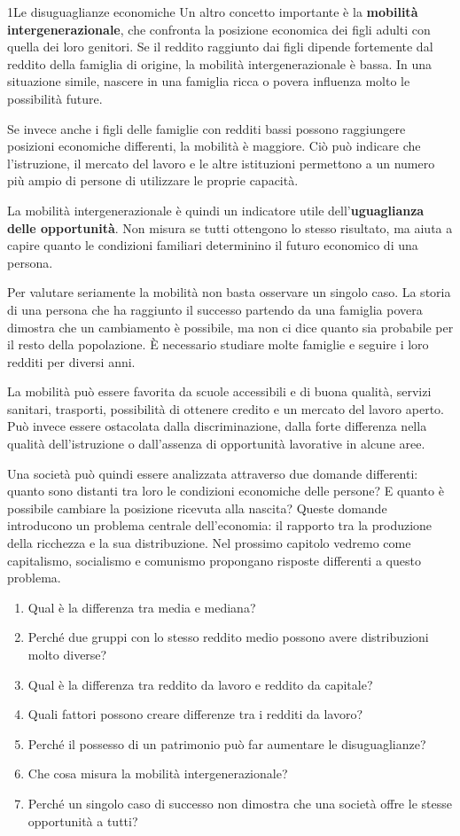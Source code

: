 \begin{lettura}{1}{Le disuguaglianze economiche}
Un altro concetto importante è la \textbf{mobilità intergenerazionale}, che confronta la posizione economica dei figli adulti con quella dei loro genitori. Se il reddito raggiunto dai figli dipende fortemente dal reddito della famiglia di origine, la mobilità intergenerazionale è bassa. In una situazione simile, nascere in una famiglia ricca o povera influenza molto le possibilità future.

Se invece anche i figli delle famiglie con redditi bassi possono raggiungere posizioni economiche differenti, la mobilità è maggiore. Ciò può indicare che l'istruzione, il mercato del lavoro e le altre istituzioni permettono a un numero più ampio di persone di utilizzare le proprie capacità.

La mobilità intergenerazionale è quindi un indicatore utile dell'\textbf{uguaglianza delle opportunità}. Non misura se tutti ottengono lo stesso risultato, ma aiuta a capire quanto le condizioni familiari determinino il futuro economico di una persona.

Per valutare seriamente la mobilità non basta osservare un singolo caso. La storia di una persona che ha raggiunto il successo partendo da una famiglia povera dimostra che un cambiamento è possibile, ma non ci dice quanto sia probabile per il resto della popolazione. È necessario studiare molte famiglie e seguire i loro redditi per diversi anni.

La mobilità può essere favorita da scuole accessibili e di buona qualità, servizi sanitari, trasporti, possibilità di ottenere credito e un mercato del lavoro aperto. Può invece essere ostacolata dalla discriminazione, dalla forte differenza nella qualità dell'istruzione o dall'assenza di opportunità lavorative in alcune aree.

Una società può quindi essere analizzata attraverso due domande differenti: quanto sono distanti tra loro le condizioni economiche delle persone? E quanto è possibile cambiare la posizione ricevuta alla nascita? Queste domande introducono un problema centrale dell'economia: il rapporto tra la produzione della ricchezza e la sua distribuzione. Nel prossimo capitolo vedremo come capitalismo, socialismo e comunismo propongano risposte differenti a questo problema.

\attivita
\begin{enumerate}
\item Qual è la differenza tra media e mediana?
\item Perché due gruppi con lo stesso reddito medio possono avere distribuzioni molto diverse?
\item Qual è la differenza tra reddito da lavoro e reddito da capitale?
\item Quali fattori possono creare differenze tra i redditi da lavoro?
\item Perché il possesso di un patrimonio può far aumentare le disuguaglianze?
\item Che cosa misura la mobilità intergenerazionale?
\item Perché un singolo caso di successo non dimostra che una società offre le stesse opportunità a tutti?
\end{enumerate}


\end{lettura}
